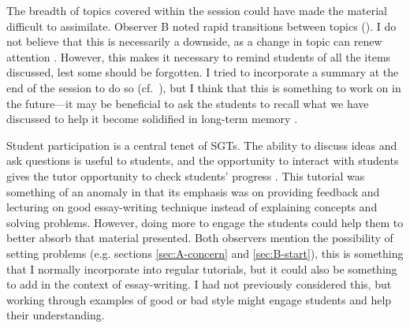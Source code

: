 The breadth of topics covered within the session could have made the material difficult to assimilate. Observer B noted rapid transitions between topics (). I do not believe that this is necessarily a downside, as a change in topic can renew attention \citep[chapter 2]{Brown1988}. However, this makes it necessary to remind students of all the items discussed, lest some should be forgotten. I tried to incorporate a summary at the end of the session to do so (cf.\ ), but I think that this is something to work on in the future---it may be beneficial to ask the students to recall what we have discussed to help it become solidified in long-term memory \citep[chapter 2]{Brown1988}.

Student participation is a central tenet of SGTs. The ability to discuss ideas and ask questions is useful to students, and the opportunity to interact with students gives the tutor opportunity to check students' progress \citep[cf.][chapter 6]{Jaques2007}. This tutorial was something of an anomaly in that its emphasis was on providing feedback and lecturing on good essay-writing technique instead of explaining concepts and solving problems. However, doing more to engage the students could help them to better absorb that material presented. Both observers mention the possibility of setting problems (e.g. sections \ref{sec:A-concern} and \ref{sec:B-start}), this is something that I normally incorporate into regular tutorials, but it could also be something to add in the context of essay-writing. I had not previously considered this, but working through examples of good or bad style might engage students and help their understanding.

